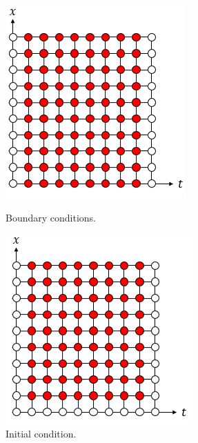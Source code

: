 \documentclass[12pt, oneside]{book}
\theoremstyle{plain}
\theoremstyle{definition}
\begin{document}
\begin{figure}[!htb]
\centering
  \begin{minipage}[b]{0.45\textwidth}
   \centering
     \includegraphics[width=\textwidth]{Boundary.png}
    \caption{Boundary conditions.}
  \end{minipage}
  \begin{minipage}[b]{0.45\textwidth}
   \centering    
    \includegraphics[width=\textwidth]{Initial.png}
    \caption{Initial condition.}
  \end{minipage}
\end{figure}
\end{document}
